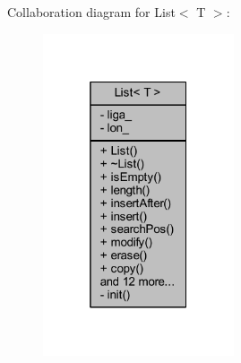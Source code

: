 Collaboration diagram for List$<$ T $>$\+:
\nopagebreak
\begin{figure}[H]
\begin{center}
\leavevmode
\includegraphics[width=160pt]{dc/de4/class_list__coll__graph}
\end{center}
\end{figure}
